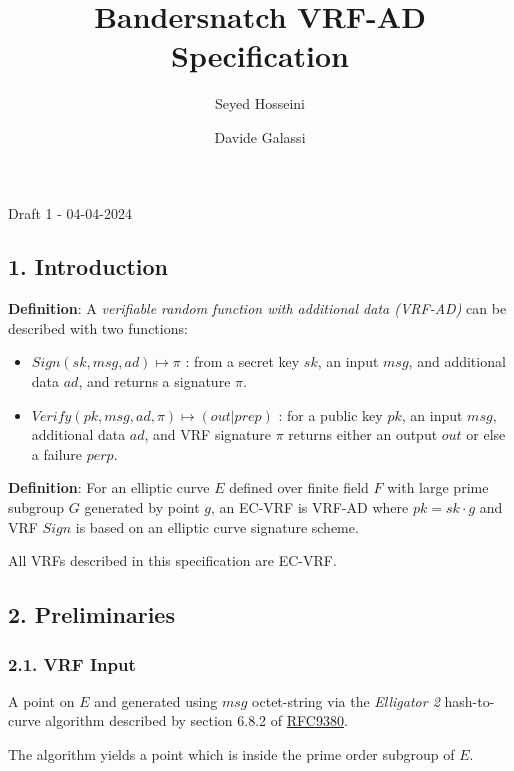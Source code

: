 \documentclass[
]{article}
\title{Bandersnatch VRF-AD Specification}
\author{Seyed Hosseini \and Davide Galassi}
\date{}
\providecommand{\tightlist}{%
  \setlength{\itemsep}{0pt}\setlength{\parskip}{0pt}}
\begin{document}
\maketitle

Draft 1 - 04-04-2024

\hypertarget{introduction}{%
\subsection{1. Introduction}\label{introduction}}

\textbf{Definition}: A \emph{verifiable random function with additional
data (VRF-AD)} can be described with two functions:

\begin{itemize}
\tightlist
\item
  \(Sign(sk,msg,ad) \mapsto \pi\) : from a secret key \(sk\), an input
  \(msg\), and additional data \(ad\), and returns a signature \(\pi\).
\item
  \(Verify(pk,msg,ad,\pi) \mapsto (out|prep)\) : for a public key
  \(pk\), an input \(msg\), additional data \(ad\), and VRF signature
  \(\pi\) returns either an output \(out\) or else a failure \(perp\).
\end{itemize}

\textbf{Definition}: For an elliptic curve \(E\) defined over finite
field \(F\) with large prime subgroup \(G\) generated by point \(g\), an
EC-VRF is VRF-AD where \(pk = sk \cdot g\) and VRF \(Sign\) is based on
an elliptic curve signature scheme.

All VRFs described in this specification are EC-VRF.

\hypertarget{preliminaries}{%
\subsection{2. Preliminaries}\label{preliminaries}}

\hypertarget{vrf-input}{%
\subsubsection{2.1. VRF Input}\label{vrf-input}}

A point on \(E\) and generated using \(msg\) octet-string via the
\emph{Elligator 2} hash-to-curve algorithm described by section 6.8.2 of
\href{https://datatracker.ietf.org/doc/rfc9380/}{RFC9380}.

The algorithm yields a point which is inside the prime order subgroup of
\(E\).
\end{document}
